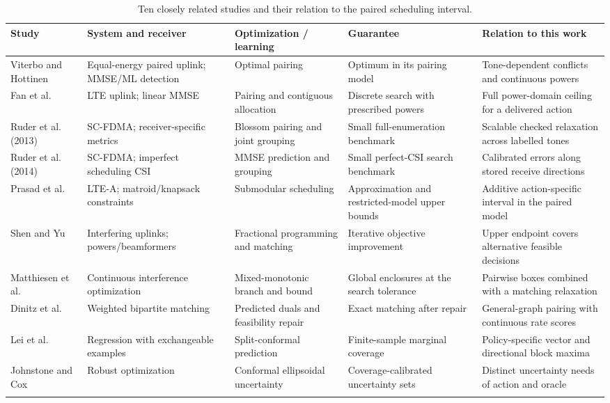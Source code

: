 \documentclass[10pt,letterpaper]{article}
\begin{document}
\begin{table}[htbp]\centering\small
\setlength{\tabcolsep}{3pt}
\caption{Ten closely related studies and their relation to the paired scheduling interval.}\label{supp:comparison}
\begin{tabular}{@{}>{\raggedright\arraybackslash}p{.14\linewidth}>{\raggedright\arraybackslash}p{.20\linewidth}>{\raggedright\arraybackslash}p{.21\linewidth}>{\raggedright\arraybackslash}p{.19\linewidth}>{\raggedright\arraybackslash}p{.20\linewidth}@{}}\toprule
Study & System and receiver & Optimization / learning & Guarantee & Relation to this work\\\midrule
Viterbo and Hottinen~\cite{viterbo} & Equal-energy paired uplink; MMSE/ML detection & Optimal pairing & Optimum in its pairing model & Tone-dependent conflicts and continuous powers\\\addlinespace[3pt]
Fan et al.~\cite{fan} & LTE uplink; linear MMSE & Pairing and contiguous allocation & Discrete search with prescribed powers & Full power-domain ceiling for a delivered action\\\addlinespace[3pt]
Ruder et al. (2013)~\cite{ruder2013} & SC-FDMA; receiver-specific metrics & Blossom pairing and joint grouping & Small full-enumeration benchmark & Scalable checked relaxation across labelled tones\\\addlinespace[3pt]
Ruder et al. (2014)~\cite{ruder2014} & SC-FDMA; imperfect scheduling CSI & MMSE prediction and grouping & Small perfect-CSI search benchmark & Calibrated errors along stored receive directions\\\addlinespace[3pt]
Prasad et al.~\cite{prasad} & LTE-A; matroid/knapsack constraints & Submodular scheduling & Approximation and restricted-model upper bounds & Additive action-specific interval in the paired model\\\addlinespace[3pt]
Shen and Yu~\cite{shenfptwo} & Interfering uplinks; powers/beamformers & Fractional programming and matching & Iterative objective improvement & Upper endpoint covers alternative feasible decisions\\\addlinespace[3pt]
Matthiesen et al.~\cite{matthiesen} & Continuous interference optimization & Mixed-monotonic branch and bound & Global enclosures at the search tolerance & Pairwise boxes combined with a matching relaxation\\\addlinespace[3pt]
Dinitz et al.~\cite{dinitz} & Weighted bipartite matching & Predicted duals and feasibility repair & Exact matching after repair & General-graph pairing with continuous rate scores\\\addlinespace[3pt]
Lei et al.~\cite{lei} & Regression with exchangeable examples & Split-conformal prediction & Finite-sample marginal coverage & Policy-specific vector and directional block maxima\\\addlinespace[3pt]
Johnstone and Cox~\cite{johnstone} & Robust optimization & Conformal ellipsoidal uncertainty & Coverage-calibrated uncertainty sets & Distinct uncertainty needs of action and oracle\\\addlinespace[3pt]
\bottomrule\end{tabular}\end{table}
\end{document}
